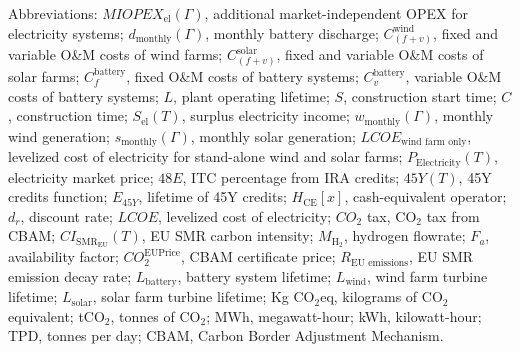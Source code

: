 \documentclass{article}
\begin{document}
\begin{table}[H]
\begin{threeparttable}
\begin{tablenotes}
  \item Abbreviations: $MIOPEX_{\text{el}}(\Gamma)$, additional market-independent OPEX for electricity systems; $d_{\text{monthly}}(\Gamma)$, monthly battery discharge; $C_{(f+v)}^{\text{wind}}$, fixed and variable O\&M costs of wind farms; $C_{(f+v)}^{\text{solar}}$, fixed and variable O\&M costs of solar farms; $C_f^{\text{battery}}$, fixed O\&M costs of battery systems; $C_v^{\text{battery}}$, variable O\&M costs of battery systems; $L$, plant operating lifetime; $S$, construction start time; $C$, construction time; $S_{\text{el}}(T)$, surplus electricity income; $w_{\text{monthly}}(\Gamma)$, monthly wind generation; $s_{\text{monthly}}(\Gamma)$, monthly solar generation; $LCOE_{\text{wind farm only}}$, levelized cost of electricity for stand-alone wind and solar farms; $P_{\text{Electricity}}(T)$, electricity market price; $48E$, ITC percentage from IRA credits; $45Y(T)$, 45Y credits function; $E_{45Y}$, lifetime of 45Y credits; $H_{\text{CE}}[x]$, cash-equivalent operator; $d_r$, discount rate; $LCOE$, levelized cost of electricity; $CO_2$ tax, CO$_2$ tax from CBAM; $CI_{\text{SMR}_{\text{EU}}}(T)$, EU SMR carbon intensity; $M_{\text{H}_2}$, hydrogen flowrate; $F_a$, availability factor; $CO_2^{\text{EUPrice}}$, CBAM certificate price; $R_{\text{EU emissions}}$, EU SMR emission decay rate; $L_{\text{battery}}$, battery system lifetime; $L_{\text{wind}}$, wind farm turbine lifetime; $L_{\text{solar}}$, solar farm turbine lifetime; Kg CO$_2$eq, kilograms of CO$_2$ equivalent; tCO$_2$, tonnes of CO$_2$; MWh, megawatt-hour; kWh, kilowatt-hour; TPD, tonnes per day; CBAM, Carbon Border Adjustment Mechanism.
\end{tablenotes}

  \end{threeparttable}
\end{table}
\end{document}
